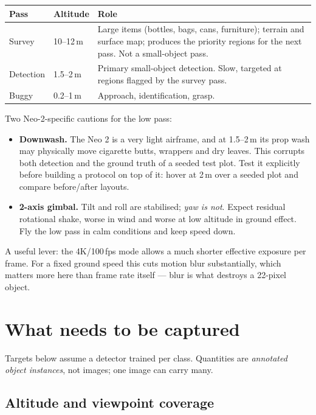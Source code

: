 \documentclass[11pt,a4paper]{article}
\begin{document}
\begin{center}
\begin{tabular}{llp{7.4cm}}
\toprule
\textbf{Pass} & \textbf{Altitude} & \textbf{Role} \\
\midrule
Survey  & 10--12\,m & Large items (bottles, bags, cans, furniture); terrain and
surface map; produces the priority regions for the next pass. Not a
small-object pass. \\
\addlinespace
Detection & 1.5--2\,m & Primary small-object detection. Slow, targeted at
regions flagged by the survey pass. \\
\addlinespace
Buggy & 0.2--1\,m & Approach, identification, grasp. \\
\bottomrule
\end{tabular}
\end{center}

\noindent Two Neo-2-specific cautions for the low pass:

\begin{itemize}[leftmargin=*,itemsep=2pt]
\item \textbf{Downwash.} The Neo 2 is a very light airframe, and at 1.5--2\,m
its prop wash may physically move cigarette butts, wrappers and dry leaves.
This corrupts both detection and the ground truth of a seeded test plot. Test
it explicitly before building a protocol on top of it: hover at 2\,m over a
seeded plot and compare before/after layouts.
\item \textbf{2-axis gimbal.} Tilt and roll are stabilised; \emph{yaw is not}.
Expect residual rotational shake, worse in wind and worse at low altitude in
ground effect. Fly the low pass in calm conditions and keep speed down.
\end{itemize}

\noindent A useful lever: the 4K/100\,fps mode allows a much shorter effective
exposure per frame. For a fixed ground speed this cuts motion blur
substantially, which matters more here than frame rate itself --- blur is what
destroys a 22-pixel object.

\section{What needs to be captured}

Targets below assume a detector trained per class. Quantities are
\emph{annotated object instances}, not images; one image can carry many.

\subsection{Altitude and viewpoint coverage}
\end{document}

